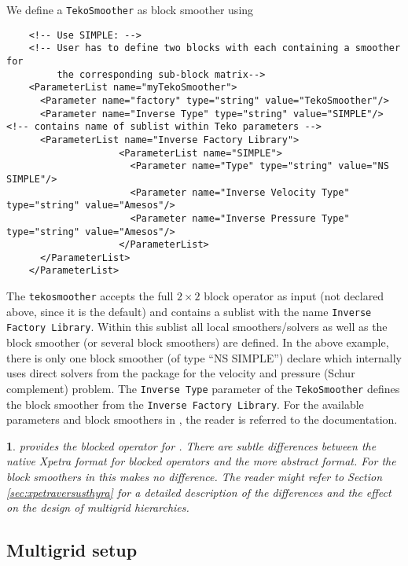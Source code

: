 \documentclass[10pt,fleqn]{book}
\newtheorem*{mycomment}{\ding{42}}
\begin{document}
We define a \texttt{TekoSmoother} as block smoother using
\begin{lstlisting}
    <!-- Use SIMPLE: -->
    <!-- User has to define two blocks with each containing a smoother for
         the corresponding sub-block matrix-->
    <ParameterList name="myTekoSmoother">
      <Parameter name="factory" type="string" value="TekoSmoother"/>
      <Parameter name="Inverse Type" type="string" value="SIMPLE"/> <!-- contains name of sublist within Teko parameters -->
      <ParameterList name="Inverse Factory Library">
                    <ParameterList name="SIMPLE">
                      <Parameter name="Type" type="string" value="NS SIMPLE"/>
                      <Parameter name="Inverse Velocity Type" type="string" value="Amesos"/>
                      <Parameter name="Inverse Pressure Type" type="string" value="Amesos"/>
                    </ParameterList>
      </ParameterList>
    </ParameterList>
\end{lstlisting}

The \texttt{tekosmoother} accepts the full $2\times 2$ block operator as input (not declared above, since it is the default) and contains a sublist with the name \texttt{Inverse Factory Library}. Within this sublist all local smoothers/solvers as well as the \teko block smoother (or several \teko block smoothers) are defined. In the above example, there is only one \teko block smoother (of type ``NS SIMPLE'') declare which internally uses direct solvers from the \amesos package for the velocity and pressure (Schur complement) problem.
The \texttt{Inverse Type} parameter of the \texttt{TekoSmoother} defines the \teko block smoother from the \texttt{Inverse Factory Library}.
For the available parameters and block smoothers in \teko, the reader is referred to the \teko documentation.

\begin{mycomment}
\muelu provides the \thyra blocked operator for \teko. There are subtle differences between the native Xpetra format for blocked operators and the more abstract \thyra format. For the block smoothers in \teko this makes no difference. The reader might refer to Section \ref{sec:xpetraversusthyra} for a detailed description of the differences and the effect on the design of multigrid hierarchies.
\end{mycomment}

\subsection{Multigrid setup}
\end{document}
